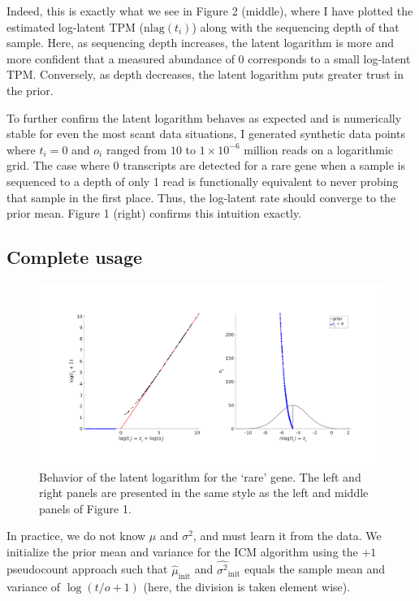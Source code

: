 \documentclass[11pt]{article}
\begin{document}
Indeed, this is exactly what we see in Figure 2 (middle), where I have plotted the estimated log-latent TPM ($\textrm{nlag}(t_i)$) along with the sequencing depth of that sample. Here, as sequencing depth increases, the latent logarithm is more and more confident that a measured abundance of 0 corresponds to a small log-latent TPM. Conversely, as depth decreases, the latent logarithm puts greater trust in the prior.

To further confirm the latent logarithm behaves as expected and is numerically stable for even the most scant data situations, I generated synthetic data points where $t_i = 0$ and $o_i$ ranged from $10$ to $1 \times 10^{-6}$ million reads on a logarithmic grid. The case where 0 transcripts are detected for a rare gene when a sample is sequenced to a depth of only 1 read is functionally equivalent to never probing that sample in the first place. Thus, the log-latent rate should converge to the prior mean. Figure 1 (right) confirms this intuition exactly.

\subsection{Complete usage}
\begin{figure}[t]
\centering
\includegraphics[trim={1cm 3cm 1cm 2cm},clip,width=\textwidth]{figure2.png}
\caption{Behavior of the latent logarithm for the `rare' gene. The left and right panels are presented in the same style as the left and middle panels of Figure 1.}
\end{figure}

In practice, we do not know $\mu$ and $\sigma^2$, and must learn it from the data. We initialize the prior mean and variance for the ICM algorithm using the $+1$ pseudocount approach such that $\hat{\mu}_{\textrm{init}}$ and $\hat{\sigma^2}_{\textrm{init}}$ equals the sample mean and variance of $\log(t/o + 1)$ (here, the division is taken element wise).
\end{document}
